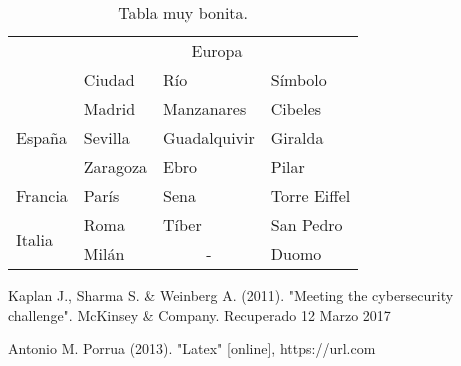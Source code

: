 \documentclass[a4paper,openright,10pt]{report}
\begin{document}
\begin{table}[htb]
	\centering
	\begin{tabular}{|l|l|l|l|}
		\hline
		& \multicolumn{3}{c|}{Europa} \\
		\cline{2-4}
		& Ciudad & Río & Símbolo\\
		\hline \hline
		\multirow{3}{1cm}{España} & Madrid & Manzanares & Cibeles\\ 
		\cline{2-4}
		& Sevilla & Guadalquivir & Giralda\\ 
		\cline{2-4}
		& Zaragoza & Ebro & Pilar\\ 
		\cline{1-4}
		Francia & París & Sena & Torre Eiffel\\ \cline{1-4}
		\multirow{2}{1cm}{Italia} & Roma & Tíber & San Pedro\\ \cline{2-4}
		& Milán & \multicolumn{1}{c|}{-} & Duomo\\ \cline{1-4}
	\end{tabular}
	\caption{Tabla muy bonita.}
	\label{tabla:final}
\end{table}


\begin{thebibliography}{99}


 Kaplan J., Sharma S. \& Weinberg A. (2011). "Meeting the cybersecurity challenge". McKinsey \& Company. Recuperado 12 Marzo 2017

 Antonio M. Porrua (2013). "Latex" [online], https://url.com
\end{thebibliography}
\end{document}
